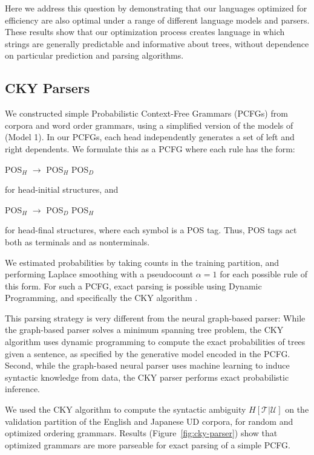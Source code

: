 \documentclass[10pt,twoside,lineno]{article}
\newcommand{\utterance}{\mathcal{U}}
\newcommand{\tree}{\mathcal{T}}
\begin{document}
Here we address this question by demonstrating that our languages optimized for efficiency are also optimal under a range of different language models and parsers. These results show that our optimization process creates language in which strings are generally predictable and informative about trees, without dependence on particular prediction and parsing algorithms.


\subsection{CKY Parsers}


We constructed simple Probabilistic Context-Free Grammars (PCFGs) from corpora and word order grammars, using a simplified version of the models of \cite{collins2003head} (Model 1).
In our PCFGs, each head independently generates a set of left and right dependents.
We formulate this as a PCFG where each rule has the form:
\begin{center}
	POS$_H$ $\rightarrow$ POS$_H$ POS$_D$
\end{center}
for head-initial structures, and
\begin{center}
	POS$_H$ $\rightarrow$ POS$_D$ POS$_H$
\end{center}
for head-final structures, where each symbol is a POS tag.
Thus, POS tags act both as terminals and as nonterminals.

We estimated probabilities by taking counts in the training partition, and performing Laplace smoothing with a pseudocount $\alpha=1$ for each possible rule of this form.
For such a PCFG, exact parsing is possible using Dynamic Programming, and specifically the CKY algorithm \cite{kasami1966efficient}.

This parsing strategy is very different from the neural graph-based parser:
While the graph-based parser solves a minimum spanning tree problem, the CKY algorithm uses dynamic programming to compute the exact probabilities of trees given a sentence, as specified by the generative model encoded in the PCFG.
Second, while the graph-based neural parser uses machine learning to induce syntactic knowledge from data, the CKY parser performs exact probabilistic inference.

We used the CKY algorithm to compute the syntactic ambiguity $H[\tree|\utterance]$ on the validation partition of the English and Japanese UD corpora, for random and optimized ordering grammars.
Results (Figure~\ref{fig:cky-parser}) show that optimized grammars are more parseable for exact parsing of a simple PCFG.
\end{document}
